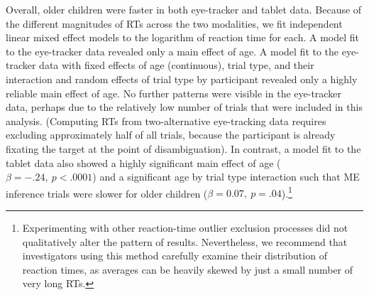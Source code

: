 \documentclass[man,noapacite]{apa2}
\begin{document}
Overall, older children were faster in both eye-tracker and tablet data. Because of the different magnitudes of RTs across the two modalities, we fit independent linear mixed effect models to the logarithm of reaction time for each. A model fit to the eye-tracker data revealed only a main effect of age. A model fit to the eye-tracker data with fixed effects of age (continuous), trial type, and their interaction and random effects of trial type by participant revealed only a highly reliable main effect of age. No further patterns were visible in the eye-tracker data, perhaps due to the relatively low number of trials that were included in this analysis. (Computing RTs from two-alternative eye-tracking data requires excluding approximately half of all trials, because the participant is already fixating the target at the point of disambiguation). 
In contrast, a model fit to the tablet data also showed a highly significant main effect of age ($\beta=-.24,~p < .0001$) and a significant age by trial type interaction such that ME inference trials were slower for older children ($\beta = 0.07,~p =.04$).\footnote{Experimenting with other reaction-time outlier exclusion processes did not qualitatively alter the pattern of results. Nevertheless, we recommend that investigators using this method carefully examine their distribution of reaction times, as averages can be heavily skewed by just a small number of very long RTs.} 
\end{document}
